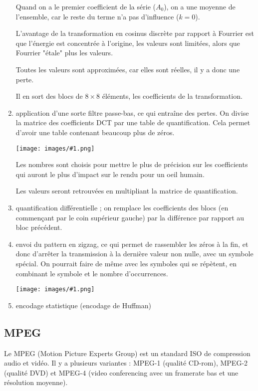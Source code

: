 \documentclass[10pt,a4paper]{report}
\newcommand{\dessin}[1]{\begin{center}\texttt{[image: images/\#1.png]}\end{center}}
\begin{document}
\begin{enumerate}
			Quand on a le premier coefficient de la série ($A_0$), on a une moyenne de l'ensemble, car le reste du terme n'a pas d'influence ($k = 0$).
			
			L'avantage de la transformation en cosinus discrète par rapport à Fourrier est que l'énergie est concentrée à l'origine, les valeurs sont limitées, alors que Fourrier "étale" plus les valeurs.
			
			Toutes les valeurs sont approximées, car elles sont réelles, il y a donc une perte.
			
			Il en sort des blocs de $8 \times 8$ éléments, les coefficients de la transformation.
			
			\item application d'une sorte filtre passe-bas, ce qui entraîne des pertes. On divise la matrice des coefficients DCT par une table de quantification. Cela permet d'avoir une table contenant beaucoup plus de zéros.
			
			\dessin{69}
			
			Les nombres sont choisis pour mettre le plus de précision sur les coefficients qui auront le plus d'impact sur le rendu pour un oeil humain.
			
			Les valeurs seront retrouvées en multipliant la matrice de quantification.
			
			\item quantification différentielle ; on remplace les coefficients des blocs (en commençant par le coin supérieur gauche) par la différence par rapport au bloc précédent.
			
			\item envoi du pattern en zigzag, ce qui permet de rassembler les zéros à la fin, et donc d'arrêter la transmission à la dernière valeur non nulle, avec un symbole spécial. On pourrait faire de même avec les symboles qui se répètent, en combinant le symbole et le nombre d'occurrences.
			
			\dessin{70}
			
			\item encodage statistique (encodage de Huffman)
			
		\end{enumerate}
		

		\subsection{MPEG}
		
		Le MPEG (Motion Picture Experts Group) est un standard ISO de compression audio et vidéo. Il y a plusieurs variantes : MPEG-1 (qualité CD-rom), MPEG-2 (qualité DVD) et MPEG-4 (video conferencing avec un framerate bas et une résolution moyenne).
		
\end{document}
